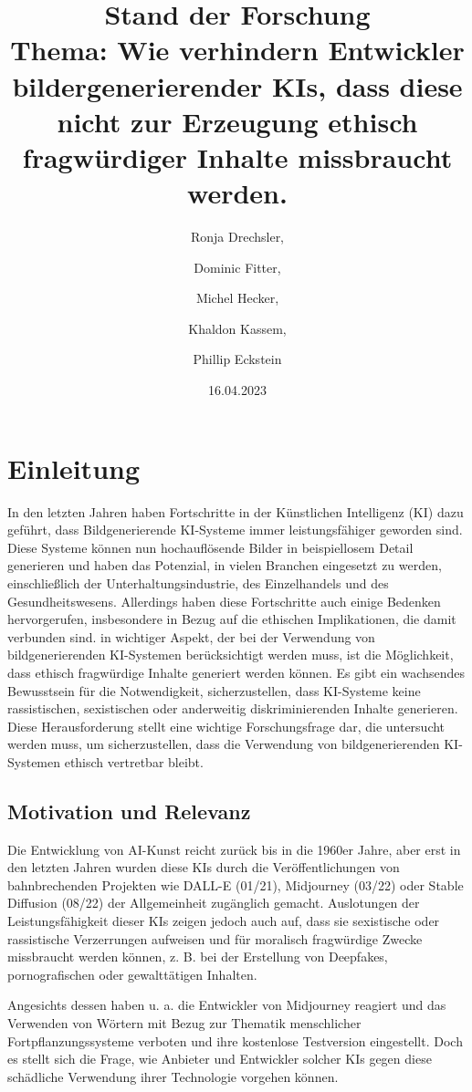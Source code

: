 \documentclass[12pt]{article}
\title{Stand der Forschung \\[1ex] \large Thema: Wie verhindern Entwickler bildergenerierender KIs, dass diese nicht zur Erzeugung ethisch fragwürdiger Inhalte missbraucht werden.}
\date{16.04.2023}
\author{Ronja Drechsler, \and Dominic Fitter, \and Michel Hecker, \and Khaldon Kassem, \and Phillip Eckstein}
\begin{document}
\maketitle
\tableofcontents
\section{Einleitung}
In den letzten Jahren haben Fortschritte in der Künstlichen Intelligenz (KI) dazu geführt, dass Bildgenerierende KI-Systeme immer 
leistungsfähiger geworden sind. Diese Systeme können nun hochauflösende Bilder in beispiellosem Detail generieren und haben das Potenzial,
 in vielen Branchen eingesetzt zu werden, einschließlich der Unterhaltungsindustrie, des Einzelhandels und des Gesundheitswesens. 
 Allerdings haben diese Fortschritte auch einige Bedenken hervorgerufen, insbesondere in Bezug auf die ethischen Implikationen, 
 die damit verbunden sind.
 in wichtiger Aspekt, der bei der Verwendung von bildgenerierenden KI-Systemen berücksichtigt werden muss, ist die Möglichkeit, 
 dass ethisch fragwürdige Inhalte generiert werden können. Es gibt ein wachsendes Bewusstsein für die Notwendigkeit, 
 sicherzustellen, dass KI-Systeme keine rassistischen, sexistischen oder anderweitig diskriminierenden Inhalte generieren. Diese 
 Herausforderung stellt eine wichtige Forschungsfrage dar, die untersucht werden muss, um sicherzustellen, dass die Verwendung von
  bildgenerierenden KI-Systemen ethisch vertretbar bleibt.

 \subsection{Motivation und Relevanz}
 Die Entwicklung von AI-Kunst reicht zurück bis in die 1960er Jahre\cite{Garcia}, aber erst in den letzten Jahren wurden 
 diese KIs durch die Veröffentlichungen von bahnbrechenden Projekten wie DALL-E (01/21), Midjourney (03/22) oder Stable Diffusion 
 (08/22) der Allgemeinheit zugänglich gemacht. Auslotungen der Leistungsfähigkeit dieser KIs zeigen jedoch auch auf, 
 dass sie sexistische oder rassistische Verzerrungen aufweisen \cite{Schmidt}und für moralisch fragwürdige Zwecke missbraucht werden 
 können, z. B. bei der Erstellung von Deepfakes, pornografischen oder gewalttätigen Inhalten.\cite{Hadero}

 Angesichts dessen haben u. a. die Entwickler von Midjourney reagiert und das Verwenden von Wörtern mit Bezug zur 
 Thematik menschlicher Fortpflanzungssysteme verboten \cite{Heikkilae} und ihre kostenlose Testversion eingestellt. 
 \cite{NelsonMidjourney} Doch es stellt sich die 
 Frage, wie Anbieter und Entwickler solcher KIs gegen diese schädliche Verwendung ihrer Technologie vorgehen können.
 
\end{document}
